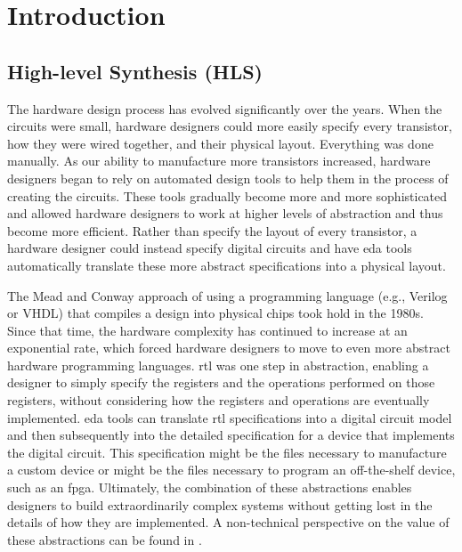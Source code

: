 
\chapter{Introduction}
\glsresetall
\label{chapter:introduction}
\section{High-level Synthesis (HLS)}

The hardware design process has evolved significantly over the years. When the circuits were small, hardware designers could more easily specify every transistor, how they were wired together, and their physical layout. Everything was done manually. As our ability to manufacture more transistors increased, hardware designers began to rely on automated design tools to help them in the process of creating the circuits. These tools gradually become more and more sophisticated and allowed hardware designers to work at higher levels of abstraction and thus become more efficient. Rather than specify the layout of every transistor, a hardware designer could instead specify digital circuits and have \gls{eda} tools automatically translate these more abstract specifications into a physical layout. 

The Mead and Conway approach \cite{mead1980introduction} of using a programming language (e.g., Verilog or VHDL) that compiles a design into physical chips took hold in the 1980s. Since that time, the hardware complexity has continued to increase at an exponential rate, which forced hardware designers to move to even more abstract hardware programming languages. \gls{rtl} was one step in abstraction, enabling a designer to simply specify the registers and the operations performed on those registers, without considering how the registers and operations are eventually implemented. \gls{eda} tools can translate \gls{rtl} specifications into a digital circuit model and then subsequently into the detailed specification for a device that implements the digital circuit.  This specification might be the files necessary to manufacture a custom device or might be the files necessary to program an off-the-shelf device, such as an \gls{fpga}. Ultimately, the combination of these abstractions enables designers to build extraordinarily complex systems without getting lost in the details of how they are implemented.  A non-technical perspective on the value of these abstractions can be found in \cite{lee2017plato}.

